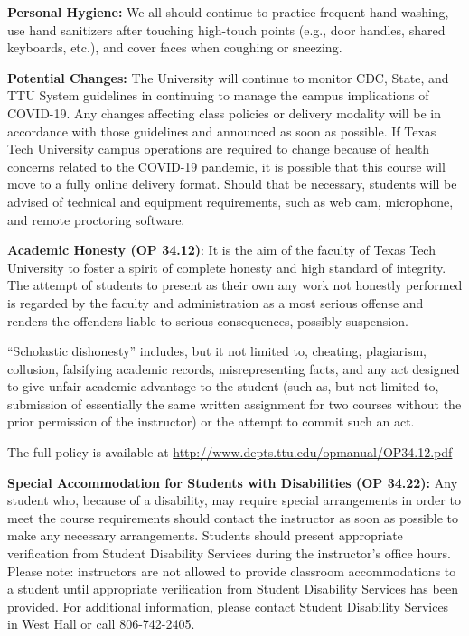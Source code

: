 \documentclass[11pt]{NSF}
\begin{document}
{\bf Personal Hygiene:} We all should continue to practice frequent hand
washing, use hand sanitizers after touching high-touch points (e.g., door
handles, shared keyboards, etc.), and cover faces when coughing or sneezing.

{\bf Potential Changes:} The University will continue to monitor CDC, State,
and TTU System guidelines in continuing to manage the campus implications of
COVID-19. Any changes affecting class policies or delivery modality will be in
accordance with those guidelines and announced as soon as possible. If Texas
Tech University campus operations are required to change because of health
concerns related to the COVID-19 pandemic, it is possible that this course will
move to a fully online delivery format. Should that be necessary, students will
be advised of technical and equipment requirements, such as web cam,
microphone, and remote proctoring software.

{\bf Academic Honesty (OP 34.12)}:
It is the aim of the faculty of Texas Tech University to foster a
spirit of complete honesty and high standard of integrity. The attempt
of students to present as their own any work not honestly performed is
regarded by the faculty and administration as a most serious offense
and renders the offenders liable to serious consequences, possibly
suspension. 

``Scholastic dishonesty” includes, but it not limited to,
cheating, plagiarism, collusion, falsifying academic records,
misrepresenting facts, and any act designed to give unfair academic
advantage to the student (such as, but not limited to, submission of
essentially the same written assignment for two courses without the
prior permission of the instructor) or the attempt to commit such an
act.  

The full policy is available at
\url{http://www.depts.ttu.edu/opmanual/OP34.12.pdf} 

{\bf Special Accommodation for Students with Disabilities 
(OP 34.22):} 
Any student who, because of
a disability, may require special arrangements in order to meet the
course requirements should contact the instructor as soon as possible
to make any necessary arrangements. Students should present
appropriate verification from Student Disability Services during the
instructor's office hours. Please note: instructors are not allowed to
provide classroom accommodations to a student until appropriate
verification from Student Disability Services has been provided. For
additional information, please contact Student Disability Services in
West Hall or call 806-742-2405.  
\end{document}
